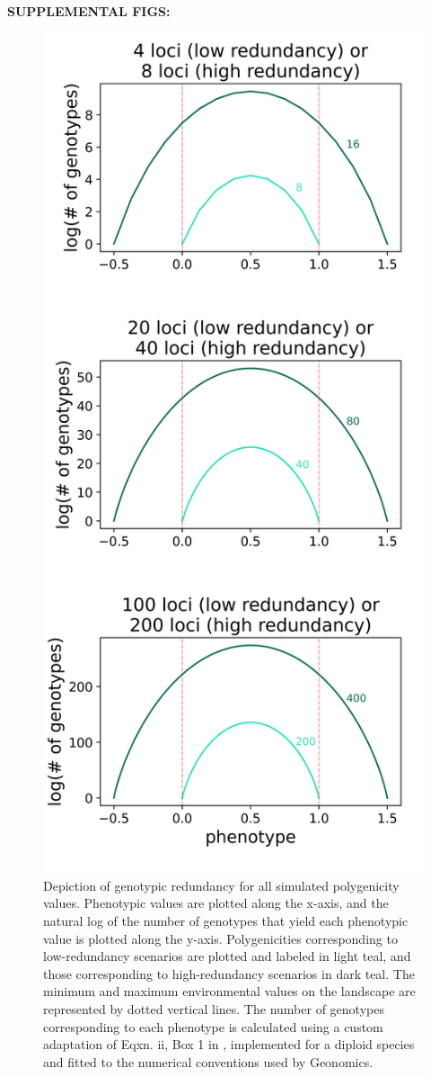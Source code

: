 \documentclass[9pt,twocolumn,twoside,lineno]{pnas-new}
\begin{document}
\pagebreak
\textbf{SUPPLEMENTAL FIGS:}


\begin{figure}
\centering
\includegraphics[width=.8\linewidth]{pub/figs_and_stats/FIG_S1_redundancy.png}
\caption{Depiction of genotypic redundancy for all simulated polygenicity values. Phenotypic values are plotted along the x-axis, and the natural log of the number of genotypes that yield each phenotypic value is plotted along the y-axis. Polygenicities corresponding to low-redundancy scenarios are plotted and labeled in light teal, and those corresponding to high-redundancy scenarios in dark teal. The minimum and maximum environmental values on the landscape are represented by dotted vertical lines. The number of genotypes corresponding to each phenotype is calculated using a custom adaptation of Eqxn. ii, Box 1 in \cite{laruson}, implemented for a diploid species and fitted to the numerical conventions used by Geonomics.
}
\label{fig:fig_s1}
\end{figure}
\end{document}
